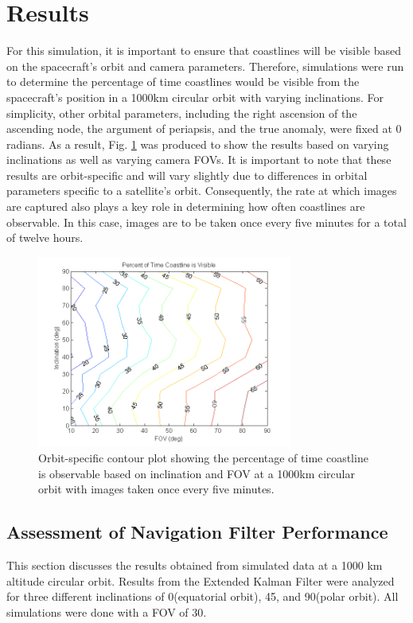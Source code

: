 \documentclass[]{aiaa-tc}%
\begin{document}
\section{Results}
For this simulation, it is important to ensure that coastlines will be visible based on the spacecraft's orbit and camera parameters.  Therefore, simulations were run to determine the percentage of time coastlines would be visible from the spacecraft's position in a 1000km circular orbit with varying inclinations.  For simplicity, other orbital parameters, including the right ascension of the ascending node, the argument of periapsis, and the true anomaly, were fixed at 0 radians.  As a result, Fig. \ref{fig:contourplot} was produced to show the results based on varying inclinations as well as varying camera FOVs.  It is important to note that these results are orbit-specific and will vary slightly due to differences in orbital parameters specific to a satellite's orbit. Consequently, the rate at which images are captured also plays a key role in determining how often coastlines are observable.  In this case, images are to be taken once every five minutes for a total of twelve hours.  
\begin{figure}[ht!]
\centering
\includegraphics[width=0.75\textwidth]{contourplot} %
\caption{Orbit-specific contour plot showing the percentage of time coastline is observable based on inclination and FOV at a 1000km circular orbit with images taken once every five minutes.}
\label{fig:contourplot}
\end{figure}

\subsection{Assessment of Navigation Filter Performance}
This section discusses the results obtained from simulated data at a 1000 km altitude circular orbit.  Results from the Extended Kalman Filter were analyzed for three different inclinations of 0\degree (equatorial orbit), 45\degree, and 90\degree (polar orbit).  All simulations were done with a FOV of 30\degree.
\end{document}
